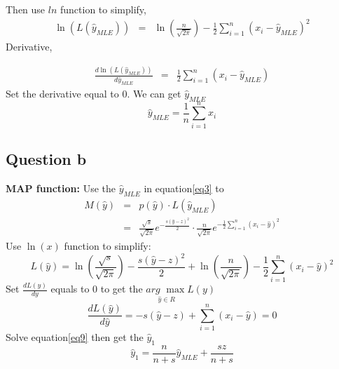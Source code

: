 \documentclass[12pt,letterpaper]{article}
\begin{document}
Then use $ln$ function to simplify,
\begin{eqnarray}\label{eq4}
  \ln(L(\hat{y}_{MLE})) &=& \ln \left( \frac{n}{\sqrt{2\pi}} \right) -\frac{1}{2}\sum_{i=1}^n{\left( x_i-\hat{y}_{MLE} \right) ^2}
\end{eqnarray}
Derivative,

\begin{eqnarray}\label{5}
\frac{d\ln \left( L\left( \hat{y}_{MLE} \right) \right)}{d\hat{y}_{MLE}}&=&\frac{1}{2}\sum_{i=1}^n{\left( x_i-\hat{y}_{MLE} \right)}
\end{eqnarray}
Set the derivative equal to 0. We can get $\hat{y}_{MLE}$
\begin{equation}\label{eq6}
  \hat{y}_{MLE}=\frac{1}{n}\sum_{i=1}^n{x_i}
\end{equation}
\subsection*{Question b}

{\bf MAP function:} Use the $\hat{y}_{MLE}$ in equation\ref{eq3} to
\begin{eqnarray}\label{eq7}
  M\left( \hat{y} \right) &=& p\left( \hat{y} \right) \cdot L\left( \hat{y}_{MLE} \right)\\ \nonumber
  &=& \frac{\sqrt{s}}{\sqrt{2\pi}}e^{-\frac{s\left( \hat{y}-z \right) ^2}{2}}\cdot \frac{n}{\sqrt{2\pi}}e^{-\frac{1}{2}\sum_{i=1}^n{\left( x_i-\hat{y}\right) ^2}}
\end{eqnarray}
Use $\ln(x)$ function to simplify:
\begin{equation}\label{eq8}
   L(\hat{y})=\ln \left( \frac{\sqrt{s}}{\sqrt{2\pi}} \right) -\frac{s\left( \hat{y}-z \right) ^2}{2}+\ln \left( \frac{n}{\sqrt{2\pi}} \right) -\frac{1}{2}\sum_{i=1}^n{\left( x_i-\hat{y} \right) ^2}
\end{equation}
Set $\frac{dL\left( y \right)}{dy}$ equals to 0 to get the $\underset{\hat{y}\in R}{arg\,\,\max}L\left( y \right) $
\begin{equation}\label{eq9}
  \frac{dL\left( \hat{y} \right)}{d\hat{y}}=-s\left( \hat{y}-z \right) +\sum_{i=1}^n{\left( x_i-\hat{y} \right)}=0
\end{equation}
Solve equation\ref{eq9} then get the $\hat{y}_{1}$
\begin{equation}\label{eq10}
  \hat{y}_1=\frac{n}{n+s}\hat{y}_{MLE}+\frac{sz}{n+s}
\end{equation}
\end{document}
